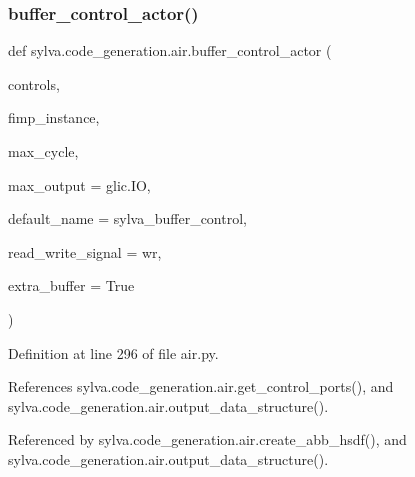 \subsubsection{\texorpdfstring{buffer\+\_\+control\+\_\+actor()}{buffer\_control\_actor()}}
{\footnotesize\ttfamily def sylva.\+code\+\_\+generation.\+air.\+buffer\+\_\+control\+\_\+actor (\begin{DoxyParamCaption}\item[{}]{controls,  }\item[{}]{fimp\+\_\+instance,  }\item[{}]{max\+\_\+cycle,  }\item[{}]{max\+\_\+output = {\ttfamily glic.IO},  }\item[{}]{default\+\_\+name = {\ttfamily \textquotesingle{}sylva\+\_\+buffer\+\_\+control\textquotesingle{}},  }\item[{}]{read\+\_\+write\+\_\+signal = {\ttfamily \textquotesingle{}wr\textquotesingle{}},  }\item[{}]{extra\+\_\+buffer = {\ttfamily True} }\end{DoxyParamCaption})}



Definition at line 296 of file air.\+py.



References sylva.\+code\+\_\+generation.\+air.\+get\+\_\+control\+\_\+ports(), and sylva.\+code\+\_\+generation.\+air.\+output\+\_\+data\+\_\+structure().



Referenced by sylva.\+code\+\_\+generation.\+air.\+create\+\_\+abb\+\_\+hsdf(), and sylva.\+code\+\_\+generation.\+air.\+output\+\_\+data\+\_\+structure().


